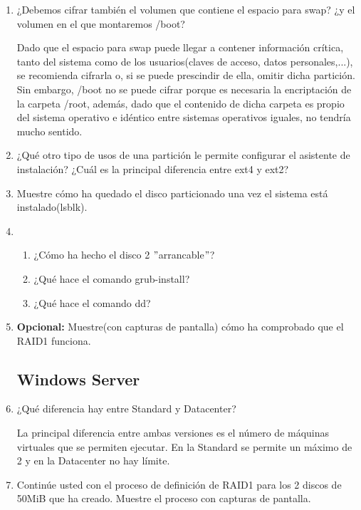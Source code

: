 \documentclass[paper=a4, fontsize=11pt]{scrartcl} %
\numberwithin{equation}{section} %
\numberwithin{figure}{section} %
\numberwithin{table}{section} %
\begin{document}
\begin{enumerate}
		\item ¿Debemos cifrar también el volumen que contiene el espacio para swap? ¿y el volumen
		en el que montaremos /boot?
		
		Dado que el espacio para swap puede llegar a contener información crítica, tanto del sistema como
		de los usuarios(claves de acceso, datos personales,...), se recomienda cifrarla o, si se puede 
		prescindir de ella, omitir dicha partición\cite{swap}. Sin embargo, /boot no se puede cifrar porque
		es necesaria la encriptación de la carpeta /root\cite{boot}, además, dado que el contenido de dicha
		carpeta es propio del sistema operativo e idéntico entre sistemas operativos iguales, no tendría mucho
		sentido.
		
		\item ¿Qué otro tipo de usos de una partición le permite configurar el asistente de instalación?
		¿Cuál es la principal diferencia entre ext4 y ext2?
		
		\item Muestre cómo ha quedado el disco particionado una vez el sistema está instalado(lsblk).
		
		\item \begin{enumerate}
			\item ¿Cómo ha hecho el disco 2 $"$arrancable$"$?
			
			\item ¿Qué hace el comando grub-install?
			
			\item ¿Qué hace el comando dd?
		\end{enumerate}
		
		\item \textbf{Opcional:} Muestre(con capturas de pantalla) cómo ha comprobado que el RAID1
		funciona.
		
	\subsection{Windows Server}
		\item ¿Qué diferencia hay entre Standard y Datacenter?
		
		La principal diferencia entre ambas versiones es el número de máquinas virtuales que se
		permiten ejecutar. En la Standard se permite un máximo de 2 y en la Datacenter no hay
		límite.\cite{W12_v}
		
		\item Continúe usted con el proceso de definición de RAID1 para los 2 discos de 50MiB que
		ha creado. Muestre el proceso con capturas de pantalla.
		

\end{enumerate}
\end{document}

